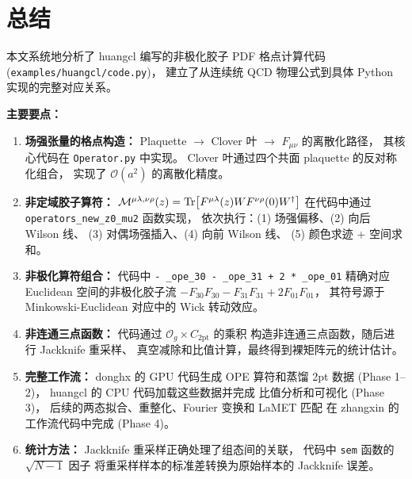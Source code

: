 \documentclass[12pt,a4paper]{ctexart}
\begin{document}
\section{总结}\label{sec:summary}

本文系统地分析了 huangcl 编写的非极化胶子 PDF 格点计算代码
(\texttt{examples/huangcl/code.py})，
建立了从连续统 QCD 物理公式到具体 Python 实现的完整对应关系。

\textbf{主要要点：}

\begin{enumerate}
    \item \textbf{场强张量的格点构造：}
        Plaquette $\to$ Clover 叶 $\to$ $F_{\mu\nu}$ 的离散化路径，
        其核心代码在 \texttt{Operator.py} 中实现。
        Clover 叶通过四个共面 plaquette 的反对称化组合，
        实现了 $\mathcal{O}(a^2)$ 的离散化精度。

    \item \textbf{非定域胶子算符：}
        $\mathcal{M}^{\mu\lambda,\nu\rho}(z) = \Tr[F^{\mu\lambda}(z) W F^{\nu\rho}(0) W^{\dagger}]$
        在代码中通过 \texttt{operators\_new\_z0\_mu2} 函数实现，
        依次执行：(1) 场强偏移、(2) 向后 Wilson 线、
        (3) 对偶场强插入、(4) 向前 Wilson 线、
        (5) 颜色求迹 + 空间求和。

    \item \textbf{非极化算符组合：}
        代码中 \texttt{- \_ope\_30 - \_ope\_31 + 2 * \_ope\_01}
        精确对应 Euclidean 空间的非极化胶子流
        $-F_{30}F_{30} - F_{31}F_{31} + 2F_{01}F_{01}$，
        其符号源于 Minkowski-Euclidean 对应中的 Wick 转动效应。

    \item \textbf{非连通三点函数：}
        代码通过 $\mathcal{O}_g \times C_{\text{2pt}}$ 的乘积
        构造非连通三点函数，随后进行 Jackknife 重采样、
        真空减除和比值计算，最终得到裸矩阵元的统计估计。

    \item \textbf{完整工作流：}
        donghx 的 GPU 代码生成 OPE 算符和蒸馏 2pt 数据
        (Phase 1--2)，
        huangcl 的 CPU 代码加载这些数据并完成
        比值分析和可视化 (Phase 3)，
        后续的两态拟合、重整化、Fourier 变换和 LaMET 匹配
        在 zhangxin 的工作流代码中完成 (Phase 4)。

    \item \textbf{统计方法：}
        Jackknife 重采样正确处理了组态间的关联，
        代码中 \texttt{sem} 函数的 $\sqrt{N-1}$ 因子
        将重采样样本的标准差转换为原始样本的 Jackknife 误差。
\end{enumerate}
\end{document}
